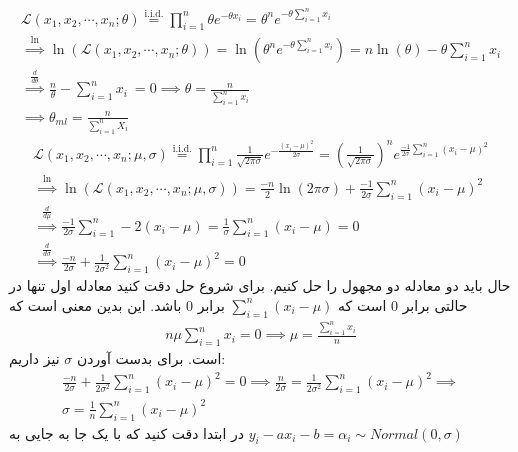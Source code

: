 \\
\begin{gather*}
    \mathcal{L}(x_1, x_2, \cdots, x_n; \theta) \stackrel{\text{i.i.d.}}{=} \prod_{i=1}^n \theta e^{-\theta x_i}
    = \theta^n e^{-\theta \sum_{i=1}^n x_i}\\
    \stackrel{\ln}{\implies} \ln(\mathcal{L}(x_1, x_2, \cdots, x_n; \theta)) = \ln(\theta^n e^{-\theta \sum_{i=1}^n x_i})
    = n \ln(\theta) - \theta \sum_{i=1}^n x_i\\
    \stackrel{\frac{d}{d \theta}}{\implies} \frac{n}{\theta} - \sum_{i=1}^n x_i\ = 0 \implies \theta = \frac{n}{\sum_{i=1}^n x_i}\\
    \implies \theta_{ml} = \frac{n}{\sum_{i=1}^n X_i}
\end{gather*}
\begin{gather*}
    \mathcal{L}(x_1, x_2, \cdots, x_n; \mu, \sigma) \stackrel{\text{i.i.d.}}{=} \prod_{i=1}^n \frac{1}{\sqrt{2 \pi \sigma}} e^{-\frac{(x_i-\mu)^2}{2 \sigma}} =
    (\frac{1}{\sqrt{2 \pi \sigma}})^n e^{\frac{-1}{2 \sigma}\sum_{i=1}^{n} (x_i-\mu)^2}\\
    \stackrel{\ln}{\implies} \ln(\mathcal{L}(x_1, x_2, \cdots, x_n; \mu, \sigma)) = \frac{-n}{2}\ln(2 \pi \sigma) + \frac{-1}{2 \sigma}\sum_{i=1}^{n} (x_i-\mu)^2\\
    \stackrel{\frac{d}{d \mu}}{\implies} \frac{-1}{2 \sigma}\sum_{i=1}^{n} -2 (x_i-\mu) = \frac{1}{\sigma}\sum_{i=1}^{n} (x_i-\mu) = 0\\
    \stackrel{\frac{d}{d \sigma}}{\implies} \frac{-n}{2 \sigma} + \frac{1}{2 \sigma^2}\sum_{i=1}^{n} (x_i-\mu)^2 = 0
\end{gather*}
حال باید دو معادله دو مجهول را حل کنیم. برای شروع حل دقت کنید معادله اول تنها در حالتی برابر 0 است که
$\sum_{i=1}^{n} (x_i-\mu)$
برابر 0 باشد. این بدین معنی است که
\begin{gather*}
    n\mu \sum_{i=1}^{n} x_i = 0 \implies \mu = \frac{\sum_{i=1}^{n} x_i}{n} 
\end{gather*}
است. برای بدست آوردن
$\sigma$
نیز داریم:
\begin{gather*}
    \frac{-n}{2 \sigma} + \frac{1}{2 \sigma^2}\sum_{i=1}^{n} (x_i-\mu)^2 = 0 \implies \frac{n}{2 \sigma} = \frac{1}{2 \sigma^2}\sum_{i=1}^{n} (x_i-\mu)^2 \implies\\
    \sigma = \frac{1}{n}\sum_{i=1}^{n} (x_i-\mu)^2
\end{gather*}
در ابتدا دقت کنید که با یک جا به جایی به
$y_i - ax_i - b = \alpha_i \sim Normal(0, \sigma)$
